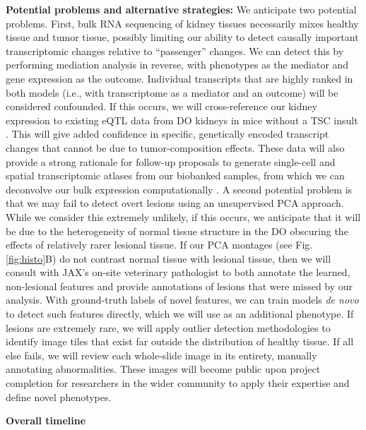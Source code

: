 \documentclass[
  12pt,
]{article}
\begin{document}
\textbf{Potential problems and alternative strategies:} We anticipate
two potential problems. First, bulk RNA sequencing of kidney tissues
necessarily mixes healthy tissue and tumor tissue, possibly limiting our
ability to detect causally important transcriptomic changes relative to
``passenger'' changes. We can detect this by performing mediation
analysis in reverse, with phenotypes as the mediator and gene expression
as the outcome. Individual transcripts that are highly ranked in both
models (i.e., with transcriptome as a mediator and an outcome) will be
considered confounded. If this occurs, we will cross-reference our
kidney expression to existing eQTL data from DO kidneys in mice without
a TSC insult \cite{33687326}. This will give added confidence in
specific, genetically encoded transcript changes that cannot be due to
tumor-composition effects. These data will also provide a strong
rationale for follow-up proposals to generate single-cell and spatial
transcriptomic atlases from our biobanked samples, from which we can
deconvolve our bulk expression computationally \cite{30670690}. A second
potential problem is that we may fail to detect overt lesions using an
unsupervised PCA approach. While we consider this extremely unlikely, if
this occurs, we anticipate that it will be due to the heterogeneity of
normal tissue structure in the DO obscuring the effects of relatively
rarer lesional tissue. If our PCA montages (see Fig. \ref{fig:histo}B)
do not contrast normal tissue with lesional tissue, then we will consult
with JAX's on-site veterinary pathologist to both annotate the learned,
non-lesional features and provide annotations of lesions that were
missed by our analysis. With ground-truth labels of novel features, we
can train models \textit{de novo} to detect such features directly,
which we will use as an additional phenotype. If lesions are extremely
rare, we will apply outlier detection methodologies
\cite{crammer_needle_2004} to identify image tiles that exist far
outside the distribution of healthy tissue. If all else fails, we will
review each whole-slide image in its entirety, manually annotating
abnormalities. These images will become public upon project completion
for researchers in the wider community to apply their expertise and
define novel phenotypes.

\textbf{Overall timeline}
\end{document}
